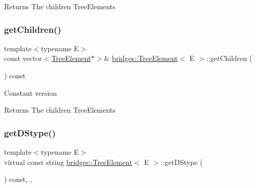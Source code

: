 \begin{DoxyReturn}{Returns}
The children Tree\+Elements 
\end{DoxyReturn}
\hypertarget{classbridges_1_1_tree_element_a5695c33c22a81a3225fa7b37c2bdf34f}{}\label{classbridges_1_1_tree_element_a5695c33c22a81a3225fa7b37c2bdf34f} 
\subsubsection{\texorpdfstring{get\+Children()}{getChildren()}\hspace{0.1cm}{\footnotesize\ttfamily [2/2]}}
{\footnotesize\ttfamily template$<$typename E$>$ \\
const vector$<$\hyperlink{classbridges_1_1_tree_element}{Tree\+Element}$\ast$$>$\& \hyperlink{classbridges_1_1_tree_element}{bridges\+::\+Tree\+Element}$<$ E $>$\+::get\+Children (\begin{DoxyParamCaption}{ }\end{DoxyParamCaption}) const\hspace{0.3cm}{\ttfamily [inline]}}

Constant version

\begin{DoxyReturn}{Returns}
The children Tree\+Elements 
\end{DoxyReturn}
\hypertarget{classbridges_1_1_tree_element_a6b264d7391442a742edf96bdd5ee5442}{}\label{classbridges_1_1_tree_element_a6b264d7391442a742edf96bdd5ee5442} 
\subsubsection{\texorpdfstring{get\+D\+Stype()}{getDStype()}}
{\footnotesize\ttfamily template$<$typename E$>$ \\
virtual const string \hyperlink{classbridges_1_1_tree_element}{bridges\+::\+Tree\+Element}$<$ E $>$\+::get\+D\+Stype (\begin{DoxyParamCaption}{ }\end{DoxyParamCaption}) const\hspace{0.3cm}{\ttfamily [inline]}, {\ttfamily [override]}, {\ttfamily [virtual]}}

